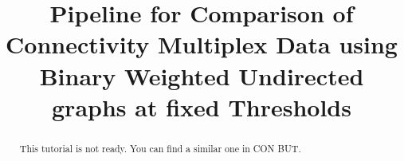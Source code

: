 \documentclass[justified]{tufte-handout}
\title{Pipeline for Comparison of Connectivity Multiplex Data using Binary Weighted Undirected graphs at fixed Thresholds}
\begin{document}
\maketitle

\begin{abstract}
\noindent
This tutorial is not ready. You can find a similar one in CON BUT.
\end{abstract}
\end{document}
